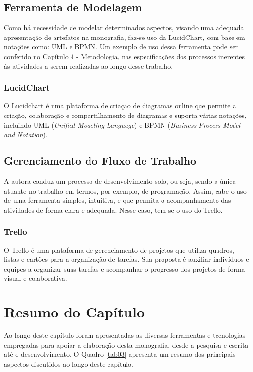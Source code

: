 \subsection{Ferramenta de Modelagem}
\label{sec:Ferramenta de Modelagem}
Como há necessidade de modelar determinados aspectos, visando uma adequada apresentação de artefatos na monografia, faz-se uso da LucidChart, com base em notações como: UML e BPMN. Um exemplo de 
uso dessa ferramenta pode ser conferido no Capítulo 4 - Metodologia, nas especificações dos processos inerentes às atividades a serem realizadas ao longo desse trabalho.

\subsubsection{LucidChart}
\label{sec:LucidChart}
O Lucidchart é uma plataforma de criação de diagramas online que permite a criação, colaboração e compartilhamento de diagramas e suporta várias notações, incluindo UML (\textit{Unified Modeling Language}) 
e BPMN (\textit{Business Process Model and Notation}).

\subsection{Gerenciamento do Fluxo de Trabalho}
\label{sec:Gerenciamento do Fluxo de Trabalho}
A autora conduz um processo de desenvolvimento solo, ou seja, sendo a única atuante no trabalho em termos, por exemplo, de programação. Assim, cabe o uso de uma ferramenta simples, intuitiva, e que 
permita o acompanhamento das atividades de forma clara e adequada. Nesse caso, tem-se o uso do Trello.

\subsubsection{Trello}
\label{sec:Trello}
O Trello é uma plataforma de gerenciamento de projetos que utiliza quadros, listas e cartões para a organização de tarefas. Sua proposta é auxiliar indivíduos e equipes a organizar suas tarefas e acompanhar o progresso 
dos projetos de forma visual e colaborativa.

\section{Resumo do Capítulo}
\label{sec:Resumo do Capítulo 2}
Ao longo deste capítulo foram apresentadas as diversas ferramentas e tecnologias empregadas para apoiar a elaboração desta monografia, desde a pesquisa e escrita até o desenvolvimento. 
O Quadro \ref{tab03} apresenta um resumo dos principais aspectos discutidos ao longo deste capítulo.


